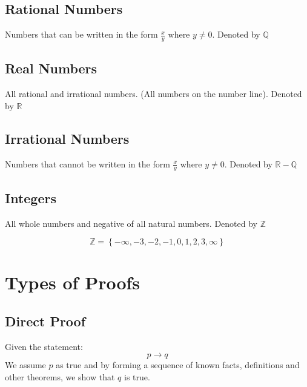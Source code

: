\documentclass[12pt letter]{report}
\begin{document}
\subsection{Rational Numbers}

Numbers that can be written in the form $\frac{x}{y}$ where $y \neq 0$. Denoted by $\mathbb{Q}$

\subsection{Real Numbers}

All rational and irrational numbers. (All numbers on the number line). Denoted by $\mathbb{R}$

\subsection{Irrational Numbers}

Numbers that cannot be written in the form $\frac{x}{y}$ where $y \neq 0$. Denoted by $\mathbb{R} - \mathbb{Q}$


\subsection{Integers}

All whole numbers and negative of all natural numbers. Denoted by $\mathbb{Z}$

\[
	\mathbb{Z} = \left\{ -\infty, -3, -2, -1, 0, 1, 2, 3, \infty \right\}
\]

\section{Types of Proofs}

\subsection{Direct Proof}

Given the statement:
\[
	p \to q
\]
We assume $p$ as true and by forming a sequence of known facts, definitions and other theorems, we show that $q$ is true.
\end{document}
